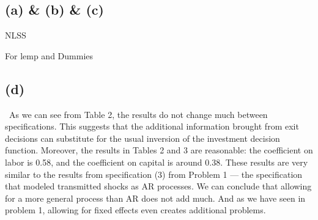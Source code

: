 

\subsection{(a) \& (b) \& (c)}



\begin{table}[h]
\parbox{.45\linewidth}{
    \centering
    \footnotesize{
    
    }
    \caption{NLSS}
    \label{tab:my_label}
    }
    \quad
\parbox{.45\linewidth}{
    \centering
    \footnotesize{
    
    }
    \caption{For lemp and Dummies}
    \label{tab:my_label}
}

\end{table}

\subsection{(d)}
\
As we can see from Table 2, the results do not change much between specifications. This suggests that the additional information brought from exit decisions can substitute for the usual inversion of the investment decision function. Moreover, the results in Tables 2 and 3 are reasonable: the coefficient on labor is 0.58, and the coefficient on capital is around 0.38. These results are very similar to the results from specification (3) from Problem 1 — the specification that modeled transmitted shocks as AR processes. We can conclude that allowing for a more general process than AR does not add much. And as we have seen in problem 1, allowing for fixed effects even creates additional problems.


